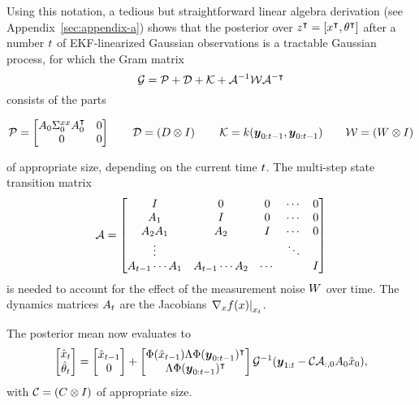 Using this notation, a tedious but straightforward linear algebra derivation
(see Appendix~\ref{sec:appendix-a}) shows that the posterior over
$z^{\intercal}=[x^{\intercal}, \theta^{\intercal}]$ after a number $t$ of EKF-linearized Gaussian
observations is a tractable Gaussian process, for which the Gram matrix
\begin{equation}
  \mathcal{G} = \mathcal{P} + \mathcal{D} + \mathcal{K} + \mathcal{A}^{-1}\mathcal{W}\mathcal{A}^{-\intercal}
\end{equation}
consists of the parts
\begin{fullwidth}\vspace{-\baselineskip}
\begin{equation}
    \mathcal{P} = \begin{bmatrix} A_0 \Sigma^{xx}_0 A_0^{\intercal}& 0 \\ 0 & 0 \end{bmatrix} \qquad
    \mathcal{D} = \left(D\otimes I\right) \qquad
    \mathcal{K} = k(\boldsymbol{y}_{0:t-1},\boldsymbol{y}_{0:t-1}) \qquad
    \mathcal{W} = \left(W\otimes I\right)
\end{equation}
\end{fullwidth}
of appropriate size, depending on the current time $t$.
The multi-step state transition matrix
\begin{equation}
  \mathcal{A} = \begin{bmatrix}
    I & 0 & 0 & \cdots & 0 \\
    A_1 & I & 0 &  \cdots & 0 \\
    A_2 A_1  & A_2 & I &  \cdots & 0 \\
    \vdots & & & \ddots & \\
    A_{t-1} \cdots A_1 & A_{t-1} \cdots A_2 & \cdots & & I \\
    \end{bmatrix}
\end{equation}
is needed to account for the effect of the measurement noise $W$ over time.
The dynamics matrices $A_t$ are the Jacobians $\left.\nabla_x
f(x)\right|_{x_t}$.

The posterior mean now evaluates to
\begin{equation}
  \label{eq:np-mean-posterior}
  \begin{bmatrix}
    \hat{x}_\tk\\
    \hat{\theta}_\tk
  \end{bmatrix} =
  \begin{bmatrix}
    \hat x_{\tk-1} \\
    0
  \end{bmatrix}
  +
  \begin{bmatrix}
    \Phi(\hat x_{\tk-1})\Lambda\Phi(\vec{y}_{0:\tk-1})\T \\
    \Lambda\Phi(\vec{y}_{0:\tk-1})\T
  \end{bmatrix}
  \G\inv
  (\vec{y}_{1:t} - \cC\cF_{:,0} A_0 \hat x_0),
\end{equation}
with $\mathcal{C} = (C\otimes I)$ of appropriate size.

